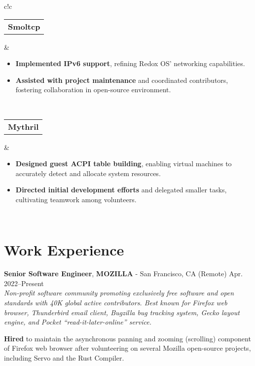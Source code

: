 \documentclass[a4paper,skipsamekey,11pt,english]{curve}
\newcommand{\makeWorkHistoryTitle}[5]{
  \begin{tcolorbox}[colback=base1!10,colframe=base1!10,frame hidden]
    {\color{blue}\textbf{#1}}, \textbf{#2} - #3 \hfill #4\\
    {\small\textit{#5}}
  \end{tcolorbox}
}
\begin{document}
\begin{center}
{\begin{tabular}{c!{\color{blue}\vrule}c}
      \hline
      {
       \begin{tabular}{c}
         \color{base03}\textbf{Smoltcp}
       \end{tabular}
      } & {
        \begin{minipage}{5in}
          \vspace{5pt}
          \begin{itemize}
            \item \textbf{Implemented IPv6 support}, refining Redox OS’
            networking capabilities.
            \item \textbf{Assisted with project maintenance} and coordinated
            contributors, fostering collaboration in open-source environment.
          \end{itemize}
        \end{minipage}
        \vspace{1pt}
      }
      \\
      \hline
      {
       \begin{tabular}{c}
         \color{base03}\textbf{Mythril}
       \end{tabular}
      } & {
        \begin{minipage}{5in}
          \vspace{5pt}
          \begin{itemize}
            \item \textbf{Designed guest ACPI table building}, enabling virtual
            machines to accurately detect and allocate system resources.
            \item \textbf{Directed initial development efforts} and delegated
            smaller tasks, cultivating teamwork among volunteers.
          \end{itemize}
        \end{minipage}
        \vspace{1pt}
      }
      \\
    \end{tabular}}
  \end{center}

  \section{Work Experience}
  \makeWorkHistoryTitle
    {Senior Software Engineer}
    {MOZILLA}
    {San Francisco, CA (Remote)}
    {Apr. 2022–Present}
    {
      Non-profit software community promoting exclusively free software and open
      standards with 40K global active contributors. Best known for Firefox web
      browser, Thunderbird email client, Bugzilla bug tracking system, Gecko
      layout engine, and Pocket “read-it-later-online” service.
    }
  \textbf{Hired} to maintain the asynchronous panning and zooming (scrolling)
  component of Firefox web browser after volunteering on several Mozilla
  open-source projects, including Servo and the Rust Compiler.
\end{document}
